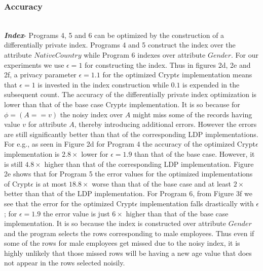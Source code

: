 \subsubsection{Accuracy}
\textbf{\textit{\\Index}}- Programs 4, 5 and 6 can be optimized by the construction of a differentially private index. Programs 4 and 5 construct the index over the attribute $NativeCountry$ while Program 6 indexes over attribute $Gender$.  For our experiments we use $\epsilon=1$ for constructing the index. Thus in figures 2d, 2e and 2f, a privacy parameter $\epsilon=1.1$ for the optimized Crypt$\epsilon$ implementation means that $\epsilon=1$ is invested in the  index construction while $0.1$ is expended in the subsequent count. The accuracy of the differentially private index optimization is lower than that of the base case Crypt$\epsilon$ implementation. It is so because for $\phi=(A==v)$ the noisy index over $A$ might miss some of the records having value $v$ for attribute $A$, thereby introducing additional errors. However the errors are still significantly better than that of the corresponding \textsf{LDP} implementations. For e.g., as seen in Figure 2d for Program 4 the accuracy of the optimized Crypt$\epsilon$ implementation is $2.8\times$ lower for $\epsilon=1.9$ than that of the base case. However, it is still $4.8 \times$ higher than that of the corresponding \textsf{LDP} implementation.  Figure 2e shows that for Program 5 the error values for the optimized implementations of Crypt$\epsilon$  is at most $18.8 \times$ worse than that of the base case and at least $2\times$ better than that of the \textsf{LDP} implementation. For Program 6, from Figure 3f we see that the error for the optimized Crypt$\epsilon$ implementation falls drastically with $\epsilon$; for $\epsilon=1.9$ the error value is just $6\times$ higher than that of the base case implementation. It is so because the index is constructed over attribute $Gender$ and the program selects the rows corresponding to male employees. Thus even if some of the rows for male employees get missed due to the noisy index, it is highly unlikely that those missed rows will be having a new age value that does not appear in the rows selected noisily.

